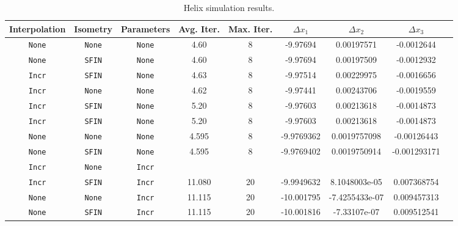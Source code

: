 
\begin{center}
\begin{table}[H]
\caption{Helix simulation results.}
\begin{tabular*}{\textwidth}{@{\extracolsep\fill}ccccccccc@{}}
\toprule
\textbf{Interpolation} & \textbf{Isometry} & \textbf{Parameters} &
\textbf{Avg. Iter.} & \textbf{Max. Iter.} &
\(\Delta x_1\) & \(\Delta x_2\) & \(\Delta x_3\) \\ %
\midrule
  \texttt{None} & \texttt{None} & \texttt{None} &  4.60  &  8 &  -9.97694 & 0.00197571 & -0.0012644 \\ %
  \texttt{None} & \texttt{SFIN} & \texttt{None} &  4.60  &  8 &  -9.97694 & 0.00197509 & -0.0012932 \\ %
  \texttt{Incr} & \texttt{SFIN} & \texttt{None} &  4.63  &  8 &  -9.97514 & 0.00229975 & -0.0016656 \\ %
  \texttt{Incr} & \texttt{None} & \texttt{None} &  4.62  &  8 &  -9.97441 & 0.00243706 & -0.0019559 \\ %
  \texttt{Incr} & \texttt{SFIN} & \texttt{None} &  5.20  &  8 &  -9.97603 & 0.00213618 & -0.0014873 \\ %
  \texttt{Incr} & \texttt{SFIN} & \texttt{None} &  5.20  &  8 &  -9.97603 & 0.00213618 & -0.0014873 \\ %
  \texttt{None} & \texttt{None} & \texttt{None} &  4.595 &  8 &  -9.9769362 &  0.0019757098  &  -0.00126443  \\
  \texttt{None} & \texttt{SFIN} & \texttt{None} &  4.595 &  8 &  -9.9769402 &  0.0019750914  &  -0.001293171 \\
  \texttt{Incr} & \texttt{None} & \texttt{Incr}  \\
  \texttt{Incr} & \texttt{SFIN} & \texttt{Incr} & 11.080 & 20 &  -9.9949632 &  8.1048003e-05 &   0.007368754 \\
  \texttt{None} & \texttt{None} & \texttt{Incr} & 11.115 & 20 &  -10.001795 & -7.4255433e-07 &   0.009457313 \\
  \texttt{None} & \texttt{SFIN} & \texttt{Incr} & 11.115 & 20 &  -10.001816 & -7.33107e-07   &   0.009512541 \\

\end{tabular*}
\end{table}
\end{center}
